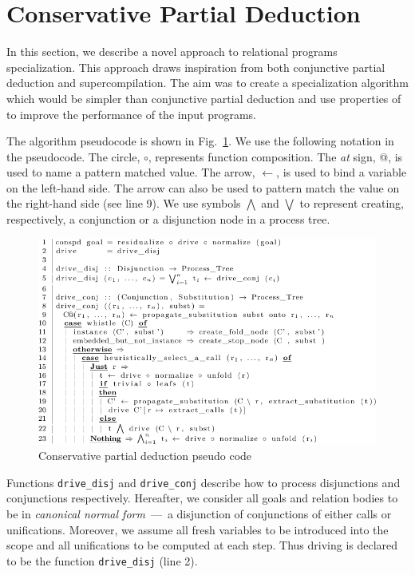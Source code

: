 \newcommand{\code}[1]{\texttt{#1}}

\section{Conservative Partial Deduction}
\label{conspd}

In this section, we describe a novel approach to relational programs specialization.
This approach draws inspiration from both conjunctive partial deduction and supercompilation.
The aim was to create a specialization algorithm which would be simpler than conjunctive partial deduction and use properties of \mk to improve the performance of the input programs.

The algorithm pseudocode is shown in Fig.~\ref{fig:ncpd-pseudo}.
We use the following notation in the pseudocode.
The circle, $\circ$, represents function composition.
The \emph{at} sign, @, is used to name a pattern matched value.
The arrow, $\leftarrow$, is used to bind a variable on the left-hand side.
The arrow can also be used to pattern match the value on the right-hand side (see line 9).
We use symbols $\bigwedge$ and $\bigvee$ to represent creating, respectively, a conjunction or a disjunction node in a process tree.


\begin{figure}[!t]
  \centering
  \includegraphics[width=\textwidth]{figures/algo-pseudo-crop.pdf}
  \caption{Conservative partial deduction pseudo code}
  \label{fig:ncpd-pseudo}
\end{figure}

Functions \code{drive\_disj} and \code{drive\_conj} describe how to process disjunctions and conjunctions respectively.
Hereafter, we consider all goals and relation bodies to be in \emph{canonical normal form}~---~a disjunction of conjunctions of either calls or unifications.
Moreover, we assume all fresh variables to be introduced into the scope and all unifications to be computed at each step.
Thus driving is declared to be the function \code{drive\_disj} (line 2).

